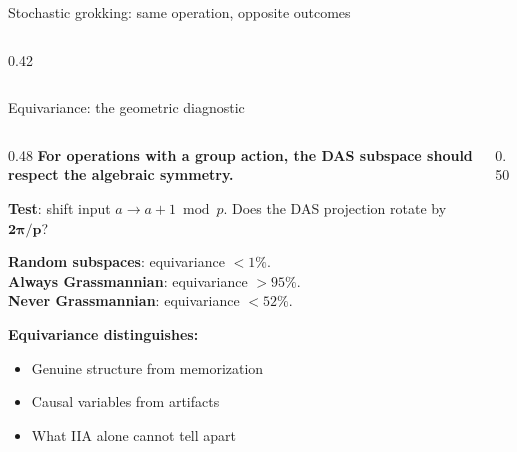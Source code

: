 \documentclass[aspectratio=169,11pt]{beamer}
\begin{document}
\begin{frame}{Stochastic grokking: same operation, opposite outcomes}
\begin{columns}[T]
\begin{column}{0.42\textwidth}
\end{column}
\end{columns}
\end{frame}

\begin{frame}{Equivariance: the geometric diagnostic}

\begin{columns}[T]
\begin{column}{0.48\textwidth}
{\small \textbf{For operations with a group action, the DAS subspace should respect the algebraic symmetry.}}

\vspace{0.3em}
{\small \textbf{Test}: shift input $a \to a + 1 \bmod p$. Does the DAS projection rotate by $\mathbf{2\pi / p}$?}

\vspace{0.3em}
{\small \textbf{Random subspaces}: equivariance $< 1\%$.\\
\textbf{Always Grassmannian}: equivariance $> 95\%$.\\
\textbf{Never Grassmannian}: equivariance $< 52\%$.}

\vspace{0.5em}
{\small \textbf{Equivariance distinguishes:}}
\begin{itemize}
  \item {\small Genuine structure from memorization}
  \item {\small Causal variables from artifacts}
  \item {\small What IIA alone cannot tell apart}
\end{itemize}
\end{column}
\begin{column}{0.50\textwidth}
\end{column}
\end{columns}
\end{frame}
\end{document}
